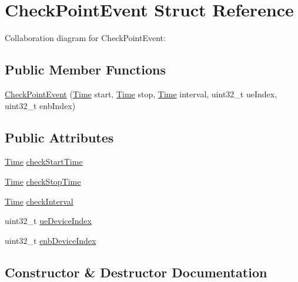 \hypertarget{structCheckPointEvent}{}\section{Check\+Point\+Event Struct Reference}
\label{structCheckPointEvent}


Collaboration diagram for Check\+Point\+Event\+:
\subsection*{Public Member Functions}
\begin{DoxyCompactItemize}
\item 
\hyperlink{structCheckPointEvent_a1e69acf8c2fe31f6f9172abf0e89459b}{Check\+Point\+Event} (\hyperlink{classns3_1_1Time}{Time} start, \hyperlink{classns3_1_1Time}{Time} stop, \hyperlink{classns3_1_1Time}{Time} interval, uint32\+\_\+t ue\+Index, uint32\+\_\+t enb\+Index)
\end{DoxyCompactItemize}
\subsection*{Public Attributes}
\begin{DoxyCompactItemize}
\item 
\hyperlink{classns3_1_1Time}{Time} \hyperlink{structCheckPointEvent_abc7b70eb318cabfefad8e615d5bc1c05}{check\+Start\+Time}
\item 
\hyperlink{classns3_1_1Time}{Time} \hyperlink{structCheckPointEvent_a1ef475a385dcd5231f2dc1b7fb35e195}{check\+Stop\+Time}
\item 
\hyperlink{classns3_1_1Time}{Time} \hyperlink{structCheckPointEvent_abfcf2c99e6f3ec62c76d5ab32f3bf8bd}{check\+Interval}
\item 
uint32\+\_\+t \hyperlink{structCheckPointEvent_adf654de34393c38769d2d63056c8ac12}{ue\+Device\+Index}
\item 
uint32\+\_\+t \hyperlink{structCheckPointEvent_a7710c8b390ece2f4d7892df546f1e2a3}{enb\+Device\+Index}
\end{DoxyCompactItemize}


\subsection{Constructor \& Destructor Documentation}
